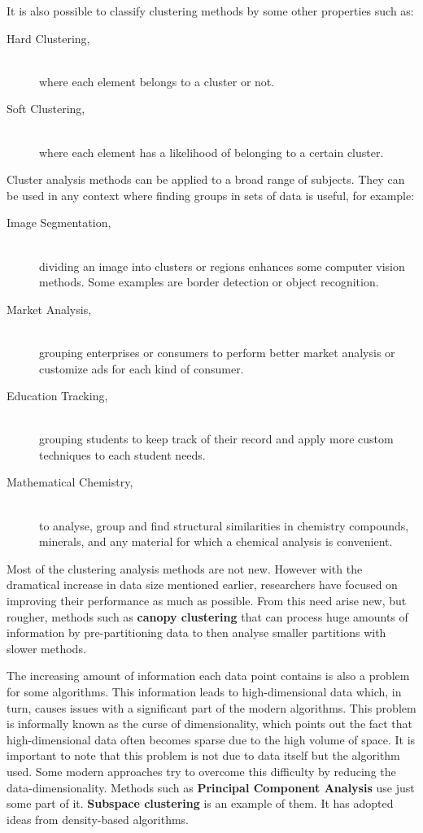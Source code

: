 It is also possible to classify clustering methods by some other properties such as:

\begin{description}
\item [Hard Clustering,] \hfill \\ where each element belongs to a cluster or not.
\item [Soft Clustering,] \hfill \\ where each element has a likelihood of belonging to a certain cluster.
\end{description}


Cluster analysis methods can be applied to a broad range of subjects. They can be used in any context where finding groups in sets of data is useful, for example:

\begin{description}
\item [Image Segmentation,] \hfill \\ dividing an image into clusters or regions enhances some computer vision methods. Some examples are border detection or object recognition. \cite{Ayech2015}
\item [Market Analysis,] \hfill \\ grouping enterprises \cite{Burca2014} or consumers \cite{Muller2014} to perform better market analysis or customize ads for each kind of consumer.
\item [Education Tracking,] \hfill \\ grouping students to keep track of their record and apply more custom techniques to each student needs. \cite{Chan2014}
\item [Mathematical Chemistry,] \hfill \\ to analyse, group and find structural similarities in chemistry compounds, minerals, and any material for which a chemical analysis is convenient. \cite{Cortes2007}
\end{description}


Most of the clustering analysis methods are not new. However with the dramatical increase in data size mentioned earlier, researchers have focused on improving their performance as much as possible. From this need arise new, but rougher, methods such as \textbf{canopy clustering} \cite{Nayak2015} that can process huge amounts of information by pre-partitioning data to then analyse smaller partitions with slower methods.

The increasing amount of information each data point contains is also a problem for some algorithms. This information leads to high-dimensional data which, in turn, causes issues with a significant part of the modern algorithms. This problem is informally known as the curse of dimensionality, which points out the fact that high-dimensional data often becomes sparse due to the high volume of space. It is important to note that this problem is not due to data itself but the algorithm used. Some modern approaches try to overcome this difficulty by reducing the data-dimensionality. Methods such as \textbf{Principal Component Analysis} \cite{Kupski2015} use just some part of it. \textbf{Subspace clustering} \cite{Adler2015} is an example of them. It has adopted ideas from density-based algorithms.

